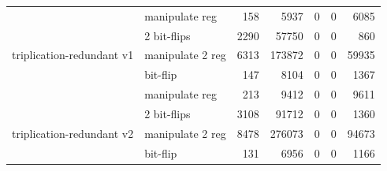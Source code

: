 \begin{table}
\begin{tabular}{llrrrrr}
                                              & manipulate reg   & 158                                               & 5937                                                   & 0 & 0                                                  & 6085                                                \\
                                              & 2 bit-flips        & 2290                                              & 57750                                                  & 0 & 0                                                  & 860                                                 \\
\multirow{-4}{*}{triplication-redundant v1} & manipulate 2 reg & 6313                                              & 173872                                                 & 0 & 0                                                  & 59935                                               \\
\hline
                                              & bit-flip          & 147                                               & 8104                                                   & 0 & 0                                                  & 1367                                                \\
                                              & manipulate reg   & 213                                               & 9412                                                   & 0 & 0                                                  & 9611                                                \\
                                              & 2 bit-flips        & 3108                                              & 91712                                                  & 0 & 0                                                  & 1360                                                \\
\multirow{-4}{*}{triplication-redundant v2} & manipulate 2 reg & 8478                                              & 276073                                                 & 0  & 0                                                 & 94673                                               \\
\hline
                                              & bit-flip          & 131                                               & 6956                                                   & 0 & 0                                                  & 1166                                                \\

\end{tabular}
\end{table}
